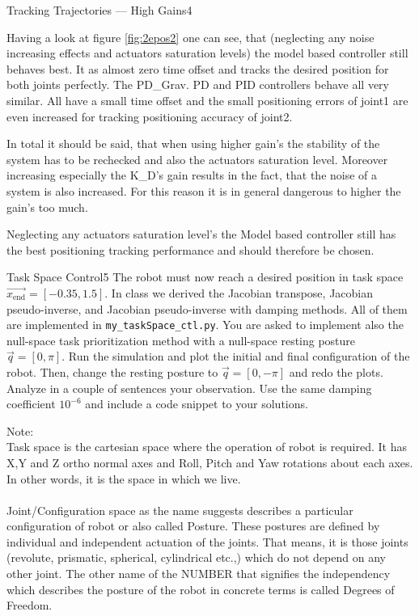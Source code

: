 \begin{questions}
\begin{question}{Tracking Trajectories --- High Gains}{4}
\begin{answer}
	Having a look at figure \ref{fig:2epos2} one can see, that (neglecting any noise increasing effects and actuators saturation levels) the model based controller still behaves best. It as almost zero time offset and tracks the desired position for both joints perfectly. The PD\_Grav. PD and PID controllers behave all very similar. All have a small time offset and the small positioning errors of joint1 are even increased for tracking positioning accuracy of joint2.
	
	In total it should be said, that when using higher gain's the stability of the system has to be rechecked and also the actuators saturation level. Moreover increasing especially the K\_D's gain results in the fact, that the noise of a system is also increased.
	For this reason it is in general dangerous to higher the gain's too much.
	
	Neglecting any actuators saturation level's the Model based controller still has the best positioning tracking performance and should therefore be chosen.
	
	\end{answer}
		
	\end{question}
	
	
	\begin{question}[bonus]{Task Space Control}{5}
		The robot must now reach a desired position in task space $\vec{x_\textrm{end}}={[-0.35,1.5]}$. In class we derived the Jacobian transpose, Jacobian pseudo-inverse, and Jacobian pseudo-inverse with damping methods. All of them are implemented in \texttt{my\_taskSpace\_ctl.py}. You are asked to implement also the null-space task prioritization method with a null-space resting posture $\vec q=[0,\pi]$. Run the simulation and plot the initial and final configuration of the robot. Then, change the resting posture to $\vec q=[0,-\pi]$ and redo the plots. Analyze in a couple of sentences your observation. Use the same damping coefficient $10^{-6}$ and include a code snippet to your solutions.
		
\begin{answer}
	Note: \\
{\footnotesize 	Task space is the cartesian space where the operation of robot is required. It has X,Y and Z ortho normal axes and Roll, Pitch and Yaw rotations about each axes. In other words, it is the space in which we live.}\\ \\
{\footnotesize 	Joint/Configuration space as the name suggests describes a particular configuration of robot or also called Posture. These postures are defined by individual and independent actuation of the joints. That means, it is those joints (revolute, prismatic, spherical, cylindrical etc.,) which do not depend on any other joint. The other name of the NUMBER that signifies the independency which describes the posture of the robot in concrete terms is called Degrees of Freedom.}



\end{answer}
\end{question}
\end{questions}
